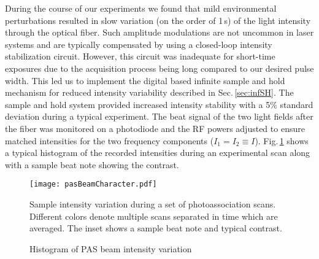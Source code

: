 During the course of our experiments we found that mild environmental perturbations resulted in slow variation (on the order of 1\,s) of the light intensity through the optical fiber.
Such amplitude modulations are not uncommon in laser systems and are typically compensated by using a closed-loop intensity stabilization circuit. 
However, this circuit was inadequate for short-time exposures due to the acquisition process being long compared to our desired pulse width.
This led us to implement the digital based infinite sample and hold mechanism for reduced intensity variability described in Sec.\,\ref{sec:infSH}. 
The sample and hold system provided increased intensity stability with a 5\% standard deviation during a typical experiment. 
The beat signal of the two light fields after the fiber was monitored on a photodiode and the RF powers adjusted to ensure matched intensities for the two frequency components ($I_1 = I_2 \equiv I$).
Fig.\,\ref{fig:PASbeamStability} shows a typical histogram of the recorded intensities during an experimental scan along with a sample beat note showing the contrast.
	\begin{figure}
		\centerline{
		\texttt{[image: pasBeamCharacter.pdf]}}
		\caption{Histogram of PAS beam intensity variation}{Sample intensity variation during a set of photoassociation scans. Different colors denote multiple scans separated in time which are averaged. The inset shows a sample beat note and typical contrast.}
		\label{fig:PASbeamStability}
	\end{figure} 

%

%
%
%
%

